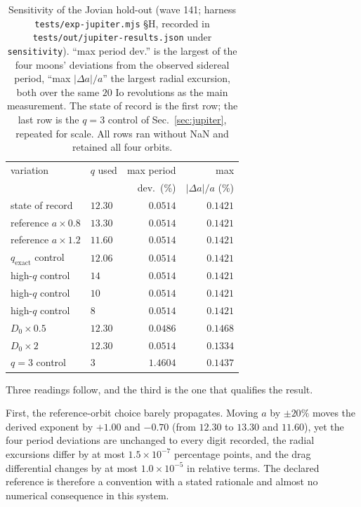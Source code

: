 \documentclass[aps,reprint,amsmath,amssymb,nofootinbib,superscriptaddress,floatfix]{revtex4-2}
\begin{document}
\begin{table}[t]
\caption{Sensitivity of the Jovian hold-out (wave 141; harness
  \texttt{tests/exp-jupiter.mjs} \S H, recorded in
  \texttt{tests/out/jupiter-results.json} under \texttt{sensitivity}).
  ``max period dev.'' is the largest of the four moons' deviations from
  the observed sidereal period, ``max $|\Delta a|/a$'' the largest
  radial excursion, both over the same $20$ Io revolutions as the main
  measurement. The state of record is the first row; the last row is the
  $q=3$ control of Sec.~\ref{sec:jupiter}, repeated for scale. All rows
  ran without NaN and retained all four orbits.}
\label{tab:jupsens}
\begin{ruledtabular}
\begin{tabular}{llrr}
variation & $q$ used & max period & max \\
 & & dev.\ (\%) & $|\Delta a|/a$ (\%) \\
\colrule
state of record & $12.30$ & $0.0514$ & $0.1421$ \\
reference $a\times0.8$ & $13.30$ & $0.0514$ & $0.1421$ \\
reference $a\times1.2$ & $11.60$ & $0.0514$ & $0.1421$ \\
$q_{\mathrm{exact}}$ control & $12.06$ & $0.0514$ & $0.1421$ \\
high-$q$ control & $14$ & $0.0514$ & $0.1421$ \\
high-$q$ control & $10$ & $0.0514$ & $0.1421$ \\
high-$q$ control & $8$ & $0.0514$ & $0.1421$ \\
$D_0\times0.5$ & $12.30$ & $0.0486$ & $0.1468$ \\
$D_0\times2$ & $12.30$ & $0.0514$ & $0.1334$ \\
$q=3$ control & $3$ & $1.4604$ & $0.1437$ \\
\end{tabular}
\end{ruledtabular}
\end{table}

Three readings follow, and the third is the one that qualifies the
result.

First, the reference-orbit choice barely propagates.
Moving $a$ by $\pm20\%$ moves the derived exponent by $+1.00$ and
$-0.70$ (from $12.30$ to $13.30$ and $11.60$), yet the four period
deviations are unchanged to every digit recorded, the radial excursions
differ by at most $1.5\times10^{-7}$ percentage points, and the drag
differential changes by at most $1.0\times10^{-5}$ in relative terms.
The declared reference is therefore a convention with a stated rationale
and almost no numerical consequence in this system.
\end{document}
